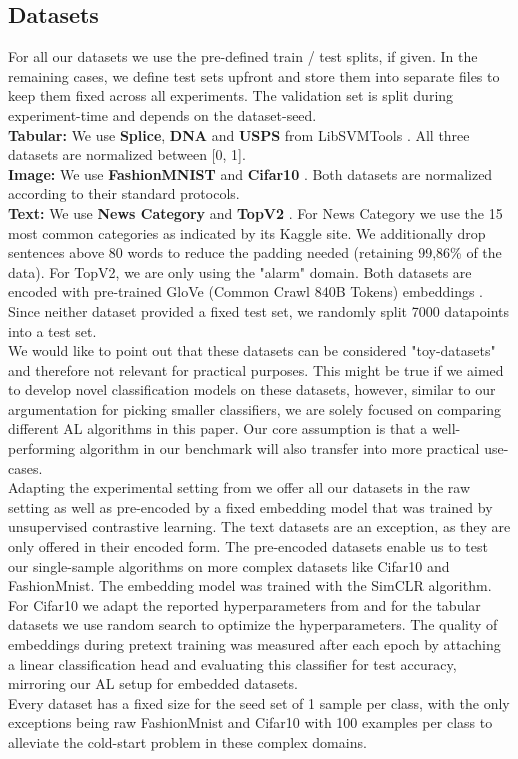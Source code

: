 \documentclass[]{article}
\begin{document}
\subsection{Datasets}\label{sec:datasets}
For all our datasets we use the pre-defined train / test splits, if given. 
In the remaining cases, we define test sets upfront and store them into separate files to keep them fixed across all experiments.
The validation set is split during experiment-time and depends on the dataset-seed.\\
\textbf{Tabular:}
We use \textbf{Splice}, \textbf{DNA} and \textbf{USPS} from LibSVMTools \cite{libsvmtools}.
All three datasets are normalized between [0, 1]. \\
\textbf{Image:}
We use \textbf{FashionMNIST} \cite{xiao2017fashion} and \textbf{Cifar10} \cite{krizhevsky2009learning}.
Both datasets are normalized according to their standard protocols. \\
\textbf{Text:}
We use \textbf{News Category} \cite{misra2022news} and \textbf{TopV2} \cite{chen-etal-2020-low-resource}.
For News Category we use  the 15 most common categories as indicated by its Kaggle site.
We additionally drop sentences above 80 words to reduce the padding needed (retaining 99,86\% of the data).
For TopV2, we are only using the "alarm" domain.
Both datasets are encoded with pre-trained GloVe (Common Crawl 840B Tokens) embeddings \cite{pennington2014glove}.
Since neither dataset provided a fixed test set, we randomly split 7000 datapoints into a test set. \\ [1mm]
%
We would like to point out that these datasets can be considered "toy-datasets" and therefore not relevant for practical purposes.
This might be true if we aimed to develop novel classification models on these datasets, however, similar to our argumentation for picking smaller classifiers, we are solely focused on comparing different AL algorithms in this paper.
Our core assumption is that a well-performing algorithm in our benchmark will also transfer into more practical use-cases. \\ [1mm]
Adapting the experimental setting from \cite{hacohen2022active} we offer all our datasets in the raw setting as well as pre-encoded by a fixed embedding model that was trained by unsupervised contrastive learning. 
The text datasets are an exception, as they are only offered in their encoded form.
The pre-encoded datasets enable us to test our single-sample algorithms on more complex datasets like Cifar10 and FashionMnist.
The embedding model was trained with the SimCLR \cite{chen2020simple} algorithm. 
For Cifar10 we adapt the reported hyperparameters from \cite{hacohen2022active} and for the tabular datasets we use random search to optimize the hyperparameters.
The quality of embeddings during pretext training was measured after each epoch by attaching a linear classification head and evaluating this classifier for test accuracy, mirroring our AL setup for embedded datasets. \\ [1mm]
Every dataset has a fixed size for the seed set of 1 sample per class, with the only exceptions being raw FashionMnist and Cifar10 with 100 examples per class to alleviate the cold-start problem in these complex domains.
\end{document}
